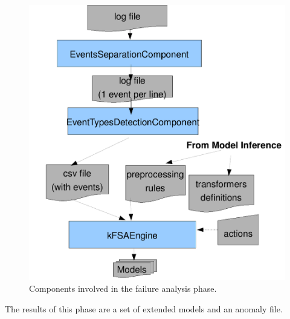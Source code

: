 \begin{figure}[ht!]
    \begin{center}
        \includegraphics[width=12cm]{images/failureAnalysis}
    \end{center}
    \caption{Components involved in the failure analysis phase.}
\label{fig:failureAnalysis}
\end{figure}


The results of this phase are a set of extended models and an anomaly file. 



